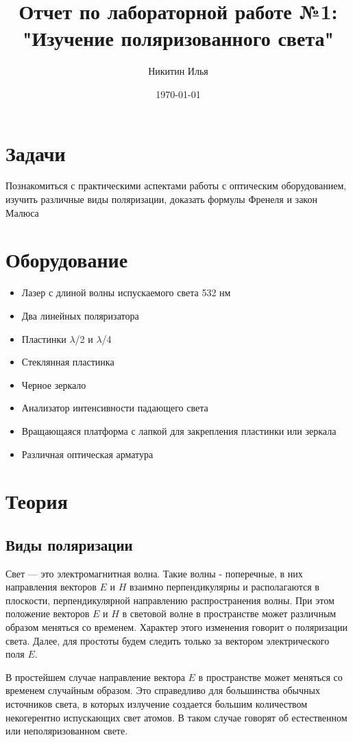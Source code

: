 \documentclass[a4paper,14pt]{extarticle}
\author{Никитин Илья}
\title{Отчет по лабораторной работе №1: "Изучение поляризованного света"}
\date{\today}
\begin{document}
	
	\maketitle
	\tableofcontents

	\section{Задачи}
		Познакомиться с практическими аспектами работы с оптическим оборудованием, изучить различные виды поляризации, доказать формулы Френеля и закон Малюса
	\section{Оборудование}
		\begin{itemize}
			\item Лазер с длиной волны испускаемого света 532 нм
			\item Два линейных поляризатора
			\item Пластинки $\lambda$/2 и $\lambda$/4
			\item Стеклянная пластинка
			\item Черное зеркало
			\item Анализатор интенсивности падающего света
			\item Вращающаяся платформа с лапкой для закрепления пластинки или зеркала
			\item Различная оптическая арматура
		\end{itemize}
	\section{Теория}
		\subsection{Виды поляризации}
			Свет — это электромагнитная волна. Такие волны - поперечные, в них направления векторов $E$ и $H$ взаимно перпендикулярны и располагаются в плоскости, перпендикулярной направлению распространения волны. При этом положение векторов $E$ и $H$ в световой волне в пространстве может различным образом меняться со временем. Характер этого изменения говорит о поляризации света. Далее, для простоты будем следить только за вектором электрического поля $E$. 
			
			В простейшем случае направление вектора $E$ в пространстве может меняться со временем случайным образом. Это справедливо для большинства обычных источников света, в которых излучение создается большим количеством некогерентно испускающих свет атомов. В таком случае говорят об естественном или неполяризованном свете. 
			
\end{document}
